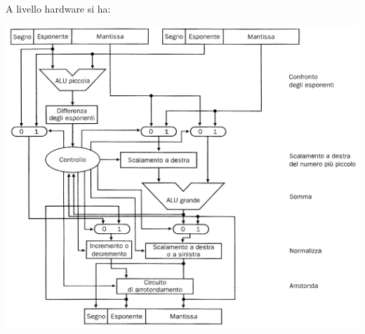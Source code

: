 \documentclass[a4paper,12pt, oneside]{book}
\begin{document}
\newpage
A livello hardware si ha:
\begin{center}
  \includegraphics[scale = 0.9]{img/sum2.png}
\end{center}
\newpage
\end{document}
